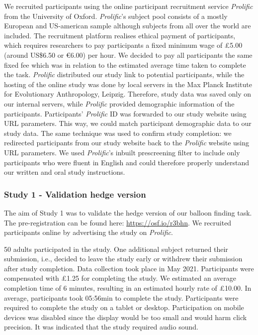 \documentclass[
  man,floatsintext]{apa6}
\begin{document}
We recruited participants using the online participant recruitment service \emph{Prolific} from the University of Oxford. \emph{Prolific}'s subject pool consists of a mostly European and US-american sample although subjects from all over the world are included. The recruitment platform realises ethical payment of participants, which requires researchers to pay participants a fixed minimum wage of £5.00 (around US\$6.50 or €6.00) per hour. We decided to pay all participants the same fixed fee which was in relation to the estimated average time taken to complete the task.
\emph{Prolific} distributed our study link to potential participants, while the hosting of the online study was done by local servers in the Max Planck Institute for Evolutionary Anthropology, Leipzig. Therefore, study data was saved only on our internal servers, while \emph{Prolific} provided demographic information of the participants.
Participants' \emph{Prolific} ID was forwarded to our study website using URL parameters. This way, we could match participant demographic data to our study data. The same technique was used to confirm study completion: we redirected participants from our study website back to the \emph{Prolific} website using URL parameters.
We used \emph{Prolific}'s inbuilt prescreening filter to include only participants who were fluent in English and could therefore properly understand our written and oral study instructions.

\hypertarget{study-1---validation-hedge-version}{%
\subsubsection{Study 1 - Validation hedge version}\label{study-1---validation-hedge-version}}

The aim of Study 1 was to validate the hedge version of our balloon finding task. The pre-registration can be found here: \url{https://osf.io/r3bhn}. We recruited participants online by advertising the study on \emph{Prolific}.

50 adults participated in the study. One additional subject returned their submission, i.e., decided to leave the study early or withdrew their submission after study completion. Data collection took place in May 2021.
Participants were compensated with £1.25 for completing the study. We estimated an average completion time of 6 minutes, resulting in an estimated hourly rate of £10.00. In average, participants took 05:56min to complete the study.
Participants were required to complete the study on a tablet or desktop. Participation on mobile devices was disabled since the display would be too small and would harm click precision. It was indicated that the study required audio sound.
\end{document}
